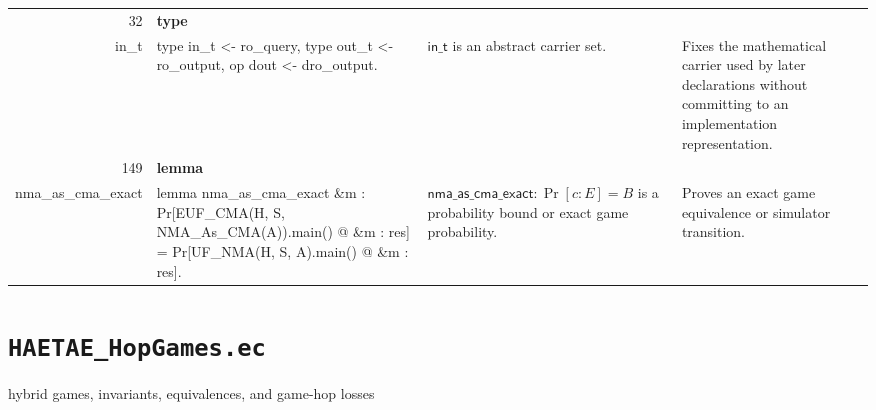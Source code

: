 \documentclass[10pt]{article}
\newcommand{\ec}[1]{\begingroup\ttfamily\scriptsize #1\endgroup}
\begin{document}
\begin{longtable}{r L{0.17\textwidth} L{0.26\textwidth} L{0.27\textwidth} L{0.20\textwidth}}
32 & \textbf{type}\\\ec{in\_t} & \ec{type in\_t <- ro\_query, type out\_t <- ro\_output, op dout <- dro\_output.} & \(\mathsf{in\_t}\) is an abstract carrier set. & Fixes the mathematical carrier used by later declarations without committing to an implementation representation. \\
149 & \textbf{lemma}\\\ec{nma\_as\_cma\_exact} & \ec{lemma nma\_as\_cma\_exact \&m : Pr[EUF\_CMA(H, S, NMA\_As\_CMA(A)).main() @ \&m : res] = Pr[UF\_NMA(H, S, A).main() @ \&m : res].} & \(\mathsf{nma\_as\_cma\_exact} : \Pr[c : E] = B\) is a probability bound or exact game probability. & Proves an exact game equivalence or simulator transition. \\
\bottomrule
\end{longtable}

\clearpage
\section{\texorpdfstring{\texttt{HAETAE\_HopGames.ec}}{HAETAE HopGames.ec}}
hybrid games, invariants, equivalences, and game-hop losses
\end{document}
